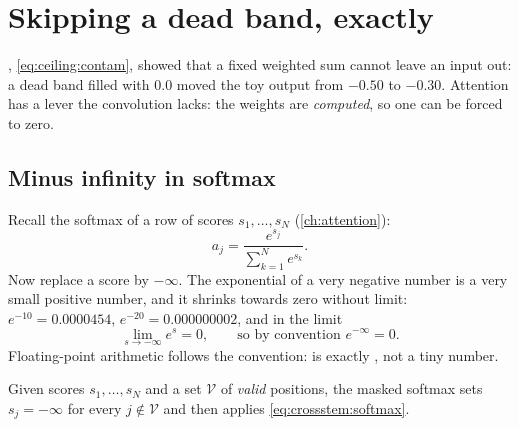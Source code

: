 \section{Skipping a dead band, exactly}\label{sec:crossstem:mask}

, \cref{eq:ceiling:contam}, showed that a fixed weighted sum cannot leave an input out: a dead band filled with 0.0 moved the toy output from $-0.50$ to $-0.30$. Attention has a lever the convolution lacks: the weights are \emph{computed}, so one can be forced to zero.

\subsection{Minus infinity in softmax}

Recall the softmax of a row of scores $s_1, \ldots, s_N$ (\cref{ch:attention}):
\begin{equation}\label{eq:crossstem:softmax}
  a_j = \frac{e^{s_j}}{\sum_{k=1}^{N}e^{s_k}} .
\end{equation}
Now replace a score by $-\infty$. The exponential of a very negative number is a very small positive number, and it shrinks towards zero without limit: $e^{-10} = 0.0000454$, $e^{-20} = 0.000000002$, and in the limit
\begin{equation}\label{eq:crossstem:expinf}
  \lim_{s\to-\infty} e^{s} = 0, \qquad\text{so by convention } e^{-\infty} = 0 .
\end{equation}
Floating-point arithmetic follows the convention:  is exactly , not a tiny number.

\begin{definition}
Given scores $s_1, \ldots, s_N$ and a set $\mathcal{V}$ of \emph{valid} positions, the masked softmax sets $s_j = -\infty$ for every $j\notin\mathcal{V}$ and then applies \cref{eq:crossstem:softmax}.
\end{definition}

